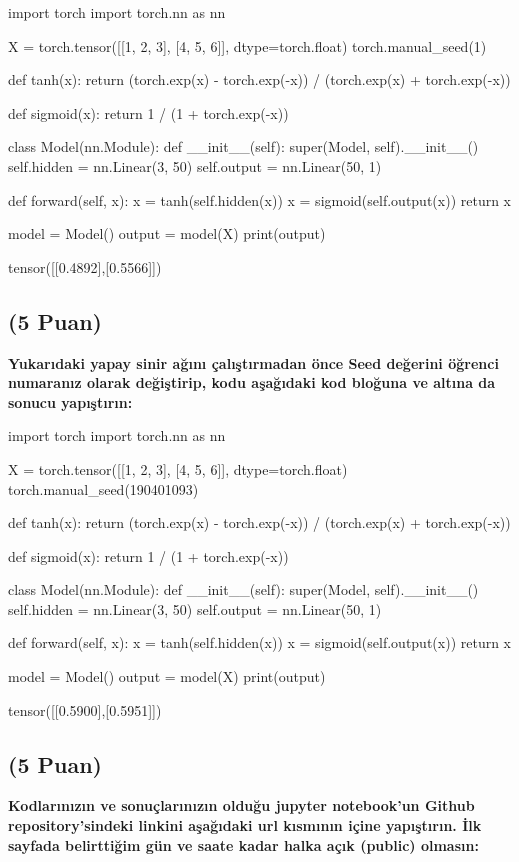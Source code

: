 \documentclass[11pt]{article}
\begin{document}
\begin{python}
import torch
import torch.nn as nn

X = torch.tensor([[1, 2, 3], [4, 5, 6]], dtype=torch.float)
torch.manual_seed(1)

def tanh(x):
  return (torch.exp(x) - torch.exp(-x)) / (torch.exp(x) + torch.exp(-x))

def sigmoid(x):
  return 1 / (1 + torch.exp(-x))

class Model(nn.Module):
    def __init__(self):
        super(Model, self).__init__()
        self.hidden = nn.Linear(3, 50)
        self.output = nn.Linear(50, 1)

    def forward(self, x):
        x = tanh(self.hidden(x))
        x = sigmoid(self.output(x))
        return x

model = Model()
output = model(X)
print(output)
\end{python}

tensor([[0.4892],[0.5566]])

\subsection{(5 Puan)} \textbf{Yukarıdaki yapay sinir ağını çalıştırmadan önce Seed değerini öğrenci numaranız olarak değiştirip, kodu aşağıdaki kod bloğuna ve altına da sonucu yapıştırın:}

\begin{python}
import torch
import torch.nn as nn

X = torch.tensor([[1, 2, 3], [4, 5, 6]], dtype=torch.float)
torch.manual_seed(190401093)

def tanh(x):
  return (torch.exp(x) - torch.exp(-x)) / (torch.exp(x) + torch.exp(-x))

def sigmoid(x):
  return 1 / (1 + torch.exp(-x))

class Model(nn.Module):
    def __init__(self):
        super(Model, self).__init__()
        self.hidden = nn.Linear(3, 50)
        self.output = nn.Linear(50, 1)

    def forward(self, x):
        x = tanh(self.hidden(x))
        x = sigmoid(self.output(x))
        return x

model = Model()
output = model(X)
print(output)
\end{python}

tensor([[0.5900],[0.5951]])

\subsection{(5 Puan)} \textbf{Kodlarınızın ve sonuçlarınızın olduğu jupyter notebook'un Github repository'sindeki linkini aşağıdaki url kısmının içine yapıştırın. İlk sayfada belirttiğim gün ve saate kadar halka açık (public) olmasın:}
\end{document}

